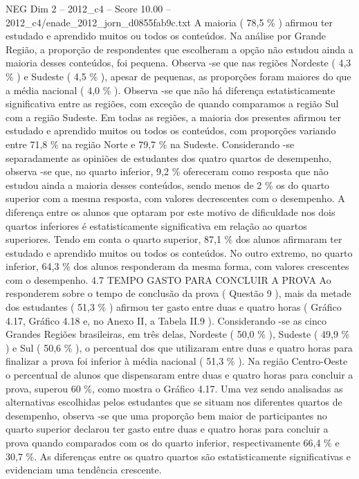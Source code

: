 \begin{textsample}{NEG Dim 2 – 2012\_c4 – Score 10.00 – 2012\_c4/enade\_2012\_jorn\_d0855fab9c.txt}
A maioria ( 78,5 \% ) afirmou ter estudado e aprendido muitos ou todos os conteúdos.
Na análise por Grande Região, a proporção de respondentes que escolheram a opção não estudou ainda a maioria desses conteúdos, foi pequena.
Observa -se que nas regiões Nordeste ( 4,3 \% ) e Sudeste ( 4,5 \% ), apesar de pequenas, as proporções foram maiores do que a média nacional ( 4,0 \% ).
Observa -se que não há diferença estatisticamente significativa entre as regiões, com exceção de quando comparamos a região Sul com a região Sudeste.
Em todas as regiões, a maioria dos presentes afirmou ter estudado e aprendido muitos ou todos os conteúdos, com proporções variando entre 71,8 \% na região Norte e 79,7 \% na Sudeste.
Considerando -se separadamente as opiniões de estudantes dos quatro quartos de desempenho, observa -se que, no quarto inferior, 9,2 \% ofereceram como resposta que não estudou ainda a maioria desses conteúdos, sendo menos de 2 \% os do quarto superior com a mesma resposta, com valores decrescentes com o desempenho.
A diferença entre os alunos que optaram por este motivo de dificuldade nos dois quartos inferiores é estatisticamente significativa em relação ao quartos superiores.
Tendo em conta o quarto superior, 87,1 \% dos alunos afirmaram ter estudado e aprendido muitos ou todos os conteúdos.
No outro extremo, no quarto inferior, 64,3 \% dos alunos responderam da mesma forma, com valores crescentes com o desempenho. 4.7 TEMPO GASTO PARA CONCLUIR A PROVA Ao responderem sobre o tempo de conclusão da prova ( Questão 9 ), mais da metade dos estudantes ( 51,3 \% ) afirmou ter gasto entre duas e quatro horas ( Gráfico 4.17, Gráfico 4.18 e, no Anexo II, a Tabela II.9 ).
Considerando -se as cinco Grandes Regiões brasileiras, em três delas, Nordeste ( 50,0 \% ), Sudeste ( 49,9 \% ) e Sul ( 50,6 \% ), o percentual dos que utilizaram entre duas e quatro horas para finalizar a prova foi inferior à média nacional ( 51,3 \% ).
Na região Centro-Oeste o percentual de alunos que dispensaram entre duas e quatro horas para concluir a prova, superou 60 \%, como mostra o Gráfico 4.17.
Uma vez sendo analisadas as alternativas escolhidas pelos estudantes que se situam nos diferentes quartos de desempenho, observa -se que uma proporção bem maior de participantes no quarto superior declarou ter gasto entre duas e quatro horas para concluir a prova quando comparados com os do quarto inferior, respectivamente 66,4 \% e 30,7 \%.
As diferenças entre os quatro quartos são estatisticamente significativas e evidenciam uma tendência crescente.

\end{textsample}

